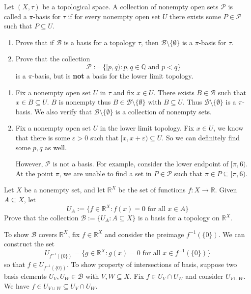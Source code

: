 \documentclass[../main.tex]{subfiles}
\begin{document}
\begin{problem}[5]
    Let $(X, \tau)$ be a topological space.
    A collection of nonempty open sets $\mathscr{P}$ is called a $\pi$-basis for $\tau$ if for every nonempty open set $U$ there exists some $P \in \mathscr{P}$ such that $P \subseteq U$.
    \begin{enumerate}[label=(\alph*)]
        \item Prove that if $\mathscr{B}$ is a basis for a topology $\tau$, then $\mathscr{B} \setminus \{ \emptyset \}$ is a $\pi$-basis for $\tau$.
        \item Prove that the collection
            \[
                \mathscr{P} := \{ [p, q) : p, q \in \mathbb{Q} \text{ and } p < q \}
            \]
            is a $\pi$-basis, but is \textbf{not} a basis for the lower limit topology.
    \end{enumerate}
\end{problem}
\begin{enumerate}[label=(\alph*)]
    \item Fix a nonempty open set $U$ in $\tau$ and fix $x \in U$.
        There exists $B \in \mathscr{B}$ such that $x \in B \subseteq U$.
        $B$ is nonempty thus $B \in \mathscr{B} \setminus \{ \emptyset \}$ with $B \subseteq U$.
        Thus $\mathscr{B} \setminus \{ \emptyset \}$ is a $\pi$-basis.
        We also verify that $\mathscr{B} \setminus \{ \emptyset \}$ is a collection of nonempty sets.
    \item Fix a nonempty open set $U$ in the lower limit topology.
        Fix $x \in U$, we know that there is some $\varepsilon > 0$ such that $[x, x + \varepsilon) \subseteq U$.
        So we can definitely find some $p, q$ as well.

        However, $\mathscr{P}$ is not a basis.
        For example, consider the lower endpoint of $[\pi, 6)$.
        At the point $\pi$, we are unable to find a set in $P \in \mathscr{P}$ such that $\pi \in P \subseteq [\pi, 6)$.
\end{enumerate}

\begin{problem}[6]
    Let $X$ be a nonempty set, and let $\mathbb{R}^X$ be the set of functions $f : X \to \mathbb{R}$.
    Given $A \subseteq X$, let
    \[
        U_A := \{ f \in \mathbb{R}^X : f(x) = 0 \text{ for all } x \in A \}
    \]
    Prove that the collection $\mathscr{B} := \{ U_A : A \subseteq X \}$ is a basis for a topology on $\mathbb{R}^X$.
\end{problem}
To show $\mathscr{B}$ covers $\mathbb{R}^X$,
fix $f \in \mathbb{R}^X$ and consider the preimage $f^{-1}(\{ 0 \})$.
We can construct the set
\[
    U_{f^{-1}(\{ 0 \})} = \{ g \in \mathbb{R}^X : g(x) = 0 \text{ for all } x \in f^{-1}(\{ 0 \}) \}
\]
so that $f \in U_{f^{-1}(\{ 0 \})}$.
To show property of intersections of basis,
suppose two basis elements $U_V, U_W \in \mathscr{B}$ with $V, W \subseteq X$.
Fix $f \in U_V \cap U_W$ and consider $U_{V \cup W}$.
We have $f \in U_{V \cup W} \subseteq U_V \cap U_W$.
\end{document}
